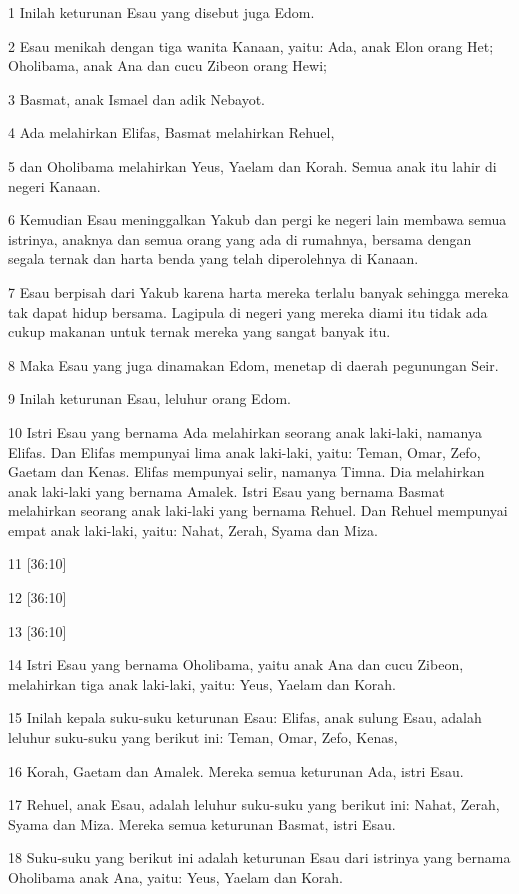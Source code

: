 \par 1 Inilah keturunan Esau yang disebut juga Edom.
\par 2 Esau menikah dengan tiga wanita Kanaan, yaitu: Ada, anak Elon orang Het; Oholibama, anak Ana dan cucu Zibeon orang Hewi;
\par 3 Basmat, anak Ismael dan adik Nebayot.
\par 4 Ada melahirkan Elifas, Basmat melahirkan Rehuel,
\par 5 dan Oholibama melahirkan Yeus, Yaelam dan Korah. Semua anak itu lahir di negeri Kanaan.
\par 6 Kemudian Esau meninggalkan Yakub dan pergi ke negeri lain membawa semua istrinya, anaknya dan semua orang yang ada di rumahnya, bersama dengan segala ternak dan harta benda yang telah diperolehnya di Kanaan.
\par 7 Esau berpisah dari Yakub karena harta mereka terlalu banyak sehingga mereka tak dapat hidup bersama. Lagipula di negeri yang mereka diami itu tidak ada cukup makanan untuk ternak mereka yang sangat banyak itu.
\par 8 Maka Esau yang juga dinamakan Edom, menetap di daerah pegunungan Seir.
\par 9 Inilah keturunan Esau, leluhur orang Edom.
\par 10 Istri Esau yang bernama Ada melahirkan seorang anak laki-laki, namanya Elifas. Dan Elifas mempunyai lima anak laki-laki, yaitu: Teman, Omar, Zefo, Gaetam dan Kenas. Elifas mempunyai selir, namanya Timna. Dia melahirkan anak laki-laki yang bernama Amalek. Istri Esau yang bernama Basmat melahirkan seorang anak laki-laki yang bernama Rehuel. Dan Rehuel mempunyai empat anak laki-laki, yaitu: Nahat, Zerah, Syama dan Miza.
\par 11 [36:10]
\par 12 [36:10]
\par 13 [36:10]
\par 14 Istri Esau yang bernama Oholibama, yaitu anak Ana dan cucu Zibeon, melahirkan tiga anak laki-laki, yaitu: Yeus, Yaelam dan Korah.
\par 15 Inilah kepala suku-suku keturunan Esau: Elifas, anak sulung Esau, adalah leluhur suku-suku yang berikut ini: Teman, Omar, Zefo, Kenas,
\par 16 Korah, Gaetam dan Amalek. Mereka semua keturunan Ada, istri Esau.
\par 17 Rehuel, anak Esau, adalah leluhur suku-suku yang berikut ini: Nahat, Zerah, Syama dan Miza. Mereka semua keturunan Basmat, istri Esau.
\par 18 Suku-suku yang berikut ini adalah keturunan Esau dari istrinya yang bernama Oholibama anak Ana, yaitu: Yeus, Yaelam dan Korah.
